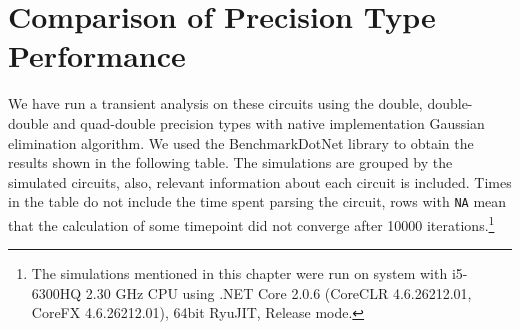 \section{Comparison of Precision Type Performance}
\label{chap:results-precision}
We have run a transient analysis on these circuits using the double, double-double and quad-double precision types with native implementation Gaussian elimination algorithm. We used the BenchmarkDotNet library to obtain the results shown in the following table. The simulations are grouped by the simulated circuits, also, relevant information about each circuit is included. Times in the table do not include the time spent parsing the circuit, rows with \texttt{NA} mean that the calculation of some timepoint did not converge after 10000 iterations.\footnote{The simulations mentioned in this chapter were run on system with i5-6300HQ 2.30 GHz CPU using .NET Core 2.0.6 (CoreCLR 4.6.26212.01, CoreFX 4.6.26212.01), 64bit RyuJIT, Release mode.}


